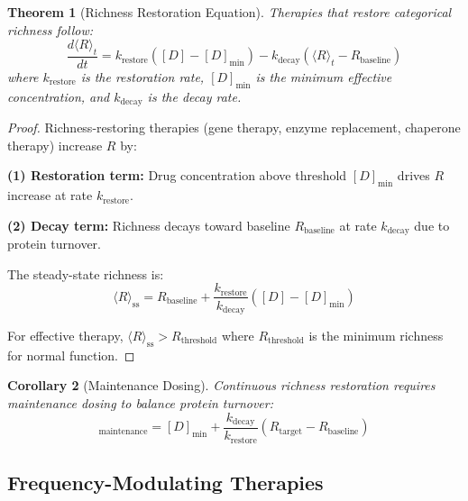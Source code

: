 \documentclass[11pt,twocolumn,a4paper]{article}
\newtheorem{theorem}{Theorem}[section]
\newtheorem{corollary}[theorem]{Corollary}
\theoremstyle{definition}
\theoremstyle{remark}
\begin{document}
\begin{theorem}[Richness Restoration Equation]
\label{thm:richness_restoration}
Therapies that restore categorical richness follow:
\begin{equation}
\frac{d\langle R \rangle_t}{dt} = k_{\mathrm{restore}} ([D] - [D]_{\min}) - k_{\mathrm{decay}} (\langle R \rangle_t - R_{\mathrm{baseline}})
\label{eq:richness_restoration}
\end{equation}
where $k_{\mathrm{restore}}$ is the restoration rate, $[D]_{\min}$ is the minimum effective concentration, and $k_{\mathrm{decay}}$ is the decay rate.
\end{theorem}

\begin{proof}
Richness-restoring therapies (gene therapy, enzyme replacement, chaperone therapy) increase $R$ by:

\textbf{(1) Restoration term:} Drug concentration above threshold $[D]_{\min}$ drives $R$ increase at rate $k_{\mathrm{restore}}$.

\textbf{(2) Decay term:} Richness decays toward baseline $R_{\mathrm{baseline}}$ at rate $k_{\mathrm{decay}}$ due to protein turnover.

The steady-state richness is:
\begin{equation}
\langle R \rangle_{\mathrm{ss}} = R_{\mathrm{baseline}} + \frac{k_{\mathrm{restore}}}{k_{\mathrm{decay}}} ([D] - [D]_{\min})
\label{eq:richness_steady_state}
\end{equation}

For effective therapy, $\langle R \rangle_{\mathrm{ss}} > R_{\mathrm{threshold}}$ where $R_{\mathrm{threshold}}$ is the minimum richness for normal function.
\end{proof}

\begin{corollary}[Maintenance Dosing]
\label{cor:maintenance_dosing}
Continuous richness restoration requires maintenance dosing to balance protein turnover:
\begin{equation}
[D]_{\mathrm{maintenance}} = [D]_{\min} + \frac{k_{\mathrm{decay}}}{k_{\mathrm{restore}}} (R_{\mathrm{target}} - R_{\mathrm{baseline}})
\label{eq:maintenance_dosing}
\end{equation}
\end{corollary}

\subsection{Frequency-Modulating Therapies}
\end{document}
